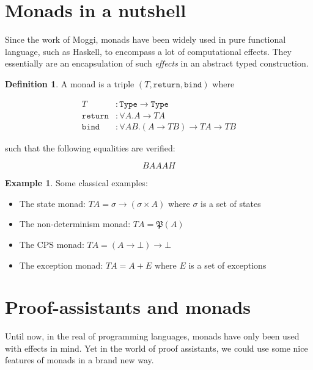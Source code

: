 \documentclass{article}
\theoremstyle{definition}
\newtheorem{definition}{Definition}
\newtheorem{example}{Example}
\theoremstyle{remark}
\begin{document}
\section{Monads in a nutshell}

Since the work of Moggi, monads have been widely used in pure functional language, such as Haskell, to encompass a lot of computational effects. They essentially are an encapsulation of such \emph{effects} in an abstract typed construction.

\begin{definition}

A monad is a triple $(T, \mathtt{return}, \mathtt{bind})$ where

\begin{align*}
T &: \mathtt{Type} \rightarrow \mathtt{Type} \\
\mathtt{return} &: \forall A. A \rightarrow T A \\
\mathtt{bind} &: \forall A B. (A \rightarrow T B) \rightarrow T A \rightarrow T B
\end{align*}

such that the following equalities are verified:

$$BAAAH$$

\end{definition}

\begin{example}

Some classical examples:

\begin{itemize}
  \item The state monad: $T A = \sigma \rightarrow (\sigma \times A)$ where $\sigma$ is a set of states
  \item The non-determinism monad: $T A = \mathfrak{P}(A)$
  \item The CPS monad: $T A = (A \rightarrow \bot) \rightarrow \bot$
  \item The exception monad: $T A = A + E$ where $E$ is a set of exceptions
\end{itemize}

\end{example}

\section{Proof-assistants and monads}

Until now, in the real of programming languages, monads have only been used with effects in mind. Yet in the world of proof assistants, we could use some nice features of monads in a brand new way.
\end{document}

